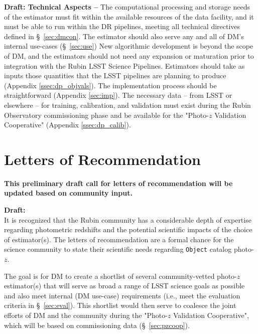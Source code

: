 \documentclass[DM,lsstdraft,toc]{lsstdoc}
\begin{document}
{\bf Draft: Technical Aspects --}
The computational processing and storage needs of the estimator must fit within the available resources of the data facility, and it must be able to run within the DR pipelines, meeting all technical directives defined in \S~\ref{sec:dmcon}. 
The estimator should also serve any and all of DM's internal use-cases (\S~\ref{sec:use})
New algorithmic development is beyond the scope of DM, and the estimators should not need any expansion or maturation prior to integration with the Rubin LSST Science Pipelines.
Estimators should take as inputs those quantities that the LSST pipelines are planning to produce (Appendix \ref{ssec:dp_objvals}).
The implementation process should be straightforward (Appendix \ref{sec:imp}).
The necessary data -- from LSST or elsewhere -- for training, calibration, and validation must exist during the Rubin Observatory commissioning phase and be available for the "Photo-$z$ Validation Cooperative" (Appendix \ref{ssec:dp_calib}).


\clearpage
\section{Letters of Recommendation} \label{sec:lor}

\textbf{This preliminary draft call for letters of recommendation will be updated based on community input.}

\textbf{Draft:} \\
It is recognized that the Rubin community has a considerable depth of expertise regarding photometric redshifts and the potential scientific impacts of the choice of estimator(s).
The letters of recommendation are a formal chance for the science community to state their scientific needs regarding {\tt Object} catalog photo-$z$.

The goal is for DM to create a shortlist of several community-vetted photo-$z$ estimator(s) that will serve as broad a range of LSST science goals as possible and also meet internal (DM use-case) requirements (i.e., meet the evaluation criteria in \S~\ref{sec:eval}).
This shortlist would then serve to coalesce the joint efforts of DM and the community during the  "Photo-$z$ Validation Cooperative", which will be based on commissioning data (\S~\ref{sec:pzcoop}). 
\end{document}
